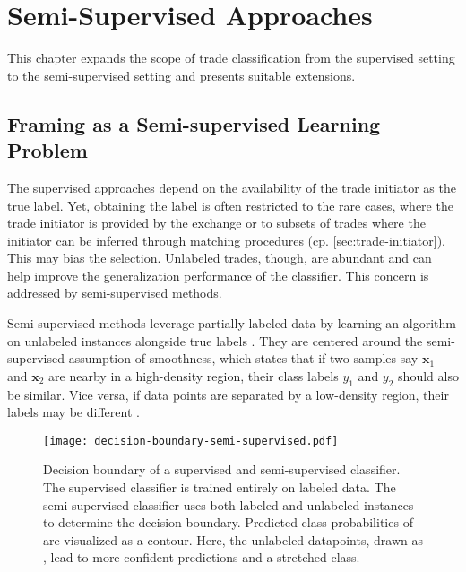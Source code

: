 \section{Semi-Supervised Approaches}\label{sec:semi-supervised-approaches}

This chapter expands the scope of trade classification from the supervised setting to the semi-supervised setting and presents suitable extensions.

\subsection{Framing as a Semi-supervised Learning Problem}\label{sec:problem-framing-2}

The supervised approaches depend on the availability of the trade initiator as the true label. Yet, obtaining the label is often restricted to the rare cases, where the trade initiator is provided by the exchange or to subsets of trades where the initiator can be inferred through matching procedures (cp. \cref{sec:trade-initiator}). This may bias the selection. Unlabeled trades, though, are abundant and can help improve the generalization performance of the classifier. This concern is addressed by semi-supervised methods.

Semi-supervised methods leverage partially-labeled data by learning an algorithm on unlabeled instances alongside true labels \autocite[][2]{chapelleSemisupervisedLearning2006}. They are centered around the semi-supervised assumption of smoothness, which states that if two samples say $\mathbf{x}_{1}$ and $\mathbf{x}_{2}$ are nearby in a high-density region, their class labels $y_{1}$ and $y_{2}$ should also be similar. Vice versa, if data points are separated by a low-density region, their labels may be different \autocite[][5]{chapelleSemisupervisedLearning2006}.

\begin{figure}[!h]
    \centering
    \texttt{[image: decision-boundary-semi-supervised.pdf]}
    \caption[Decision Boundary of Supervised and Semi-supervised Classifiers]{Decision boundary of a supervised and semi-supervised classifier. The supervised classifier is trained entirely on labeled data. The semi-supervised classifier uses both labeled and unlabeled instances to determine the decision boundary. Predicted class probabilities of  are visualized as a contour. Here, the unlabeled datapoints, drawn as , lead to more confident predictions and a stretched class.}
    \label{fig:supervised-semi-supervised}
\end{figure}

